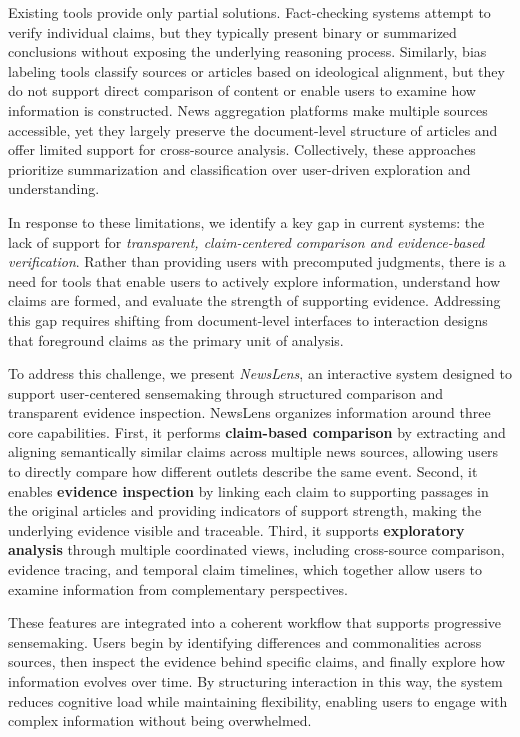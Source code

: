 \documentclass{vgtc}                          %
\begin{document}
Existing tools provide only partial solutions. Fact-checking systems attempt to verify individual claims, but they typically present binary or summarized conclusions without exposing the underlying reasoning process. Similarly, bias labeling tools classify sources or articles based on ideological alignment, but they do not support direct comparison of content or enable users to examine how information is constructed. News aggregation platforms make multiple sources accessible, yet they largely preserve the document-level structure of articles and offer limited support for cross-source analysis. Collectively, these approaches prioritize summarization and classification over user-driven exploration and understanding.

In response to these limitations, we identify a key gap in current systems: the lack of support for \textit{transparent, claim-centered comparison and evidence-based verification}. Rather than providing users with precomputed judgments, there is a need for tools that enable users to actively explore information, understand how claims are formed, and evaluate the strength of supporting evidence. Addressing this gap requires shifting from document-level interfaces to interaction designs that foreground claims as the primary unit of analysis.

To address this challenge, we present \textit{NewsLens}, an interactive system designed to support user-centered sensemaking through structured comparison and transparent evidence inspection. NewsLens organizes information around three core capabilities. First, it performs \textbf{claim-based comparison} by extracting and aligning semantically similar claims across multiple news sources, allowing users to directly compare how different outlets describe the same event. Second, it enables \textbf{evidence inspection} by linking each claim to supporting passages in the original articles and providing indicators of support strength, making the underlying evidence visible and traceable. Third, it supports \textbf{exploratory analysis} through multiple coordinated views, including cross-source comparison, evidence tracing, and temporal claim timelines, which together allow users to examine information from complementary perspectives.

These features are integrated into a coherent workflow that supports progressive sensemaking. Users begin by identifying differences and commonalities across sources, then inspect the evidence behind specific claims, and finally explore how information evolves over time. By structuring interaction in this way, the system reduces cognitive load while maintaining flexibility, enabling users to engage with complex information without being overwhelmed.
\end{document}
